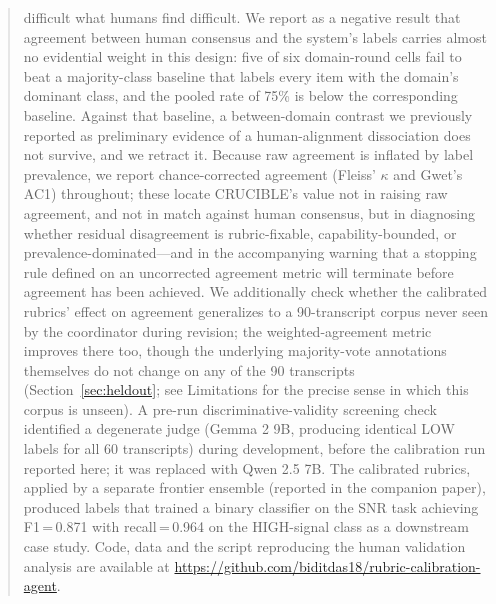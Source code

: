 \documentclass[11pt]{article}
\begin{document}
\begin{abstract}
difficult what humans find difficult. We report as a negative result that
agreement between human consensus and the system's labels carries almost
no evidential weight in this design: five of six domain-round cells fail
to beat a majority-class baseline that labels every item with the domain's
dominant class, and the pooled rate of 75\% is below the corresponding
baseline. Against that baseline, a between-domain contrast we previously
reported as preliminary evidence of a human-alignment dissociation does
not survive, and we retract it. Because raw agreement is inflated by label
prevalence, we report chance-corrected agreement (Fleiss' $\kappa$ and
Gwet's AC1) throughout; these locate CRUCIBLE's value not in raising raw
agreement, and not in match against human consensus, but in diagnosing
whether residual disagreement is rubric-fixable, capability-bounded, or
prevalence-dominated---and in the accompanying warning that a stopping
rule defined on an uncorrected agreement metric will terminate before
agreement has been achieved. We additionally check whether the calibrated
rubrics' effect on agreement generalizes to a 90-transcript corpus never
seen by the coordinator during revision; the weighted-agreement metric
improves there too, though the underlying majority-vote annotations
themselves do not change on any of the 90 transcripts
(Section~\ref{sec:heldout}; see Limitations for the precise sense in which
this corpus is unseen). A pre-run discriminative-validity screening check
identified a degenerate judge (Gemma 2 9B, producing identical LOW labels
for all 60 transcripts) during development, before the calibration run
reported here; it was replaced with Qwen 2.5 7B. The calibrated rubrics,
applied by a separate frontier ensemble (reported in the companion paper),
produced labels that trained a binary classifier on the SNR task achieving
F1\,=\,0.871 with recall\,=\,0.964 on the HIGH-signal class as a
downstream case study. Code, data and the script reproducing the human
validation analysis are available at
\url{https://github.com/biditdas18/rubric-calibration-agent}.
\end{abstract}
\end{document}
